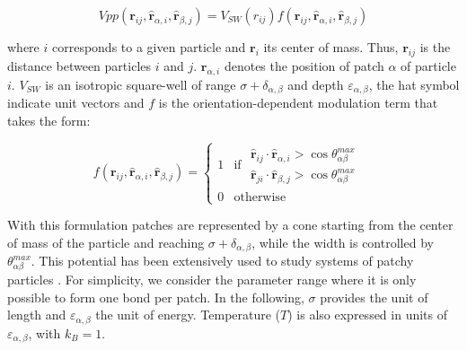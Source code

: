 \documentclass[a4paper, amsfonts, amssymb, amsmath, reprint, showkeys, nofootinbib, twoside]{revtex4-1}
\begin{document}
\begin{equation}
Vpp(\boldsymbol{r}_{ij}, \boldsymbol{\hat{r}}_{\alpha, i}, \boldsymbol{\hat{r}}_{\beta, j})=V_{SW}(r_{ij})f(\boldsymbol{r}_{ij}, \boldsymbol{\hat{r}}_{\alpha, i}, \boldsymbol{\hat{r}}_{\beta, j})
\end{equation}

where $i$ corresponds to a given particle and $\boldsymbol{r}_{i}$ its center of mass. Thus, $\boldsymbol{r}_{ij}$ is the distance between particles $i$ and $j$. $\boldsymbol{r}_{\alpha, i}$ denotes the position of patch $\alpha$ of particle $i$. $V_{SW}$ is an isotropic square-well of range $\sigma + \delta_{\alpha,\beta}$ and depth $\varepsilon_{\alpha,\beta}$, the hat symbol indicate unit vectors and $f$ is the orientation-dependent modulation term that takes the form:

\begin{equation}
\label{KF}
f(\boldsymbol{r}_{ij}, \boldsymbol{\hat{r}}_{\alpha, i}, \boldsymbol{\hat{r}}_{\beta, j})=
    \begin{cases}
        1 & \text{if $\begin{aligned}
            \text{$\boldsymbol{\hat{r}}_{ij} \cdot \boldsymbol{\hat{r}}_{\alpha, i} > \cos     \theta^{max}_{\alpha \beta}$} \\
            \text{$\boldsymbol{\hat{r}}_{ji} \cdot \boldsymbol{\hat{r}}_{\beta, j} > \cos     \theta^{max}_{\alpha \beta}$}
        \end{aligned}$ } \\
        0 & \text{otherwise}
    \end{cases}
\end{equation}

With this formulation patches are represented by a cone starting from the center of mass of the particle and reaching $\sigma + \delta_{\alpha,\beta}$, while the width is controlled by $\theta^{max}_{\alpha \beta}$. This potential has been extensively used to study systems of patchy particles \cite{Rovigatti2018}. For simplicity, we consider the parameter range where it is only possible to form one bond per patch. In the following, $\sigma$ provides the unit of length and $\varepsilon_{\alpha, \beta}$ the unit of energy. Temperature ($T$) is also expressed in units of $\varepsilon_{\alpha, \beta}$, with $k_B=1$.
\end{document}
